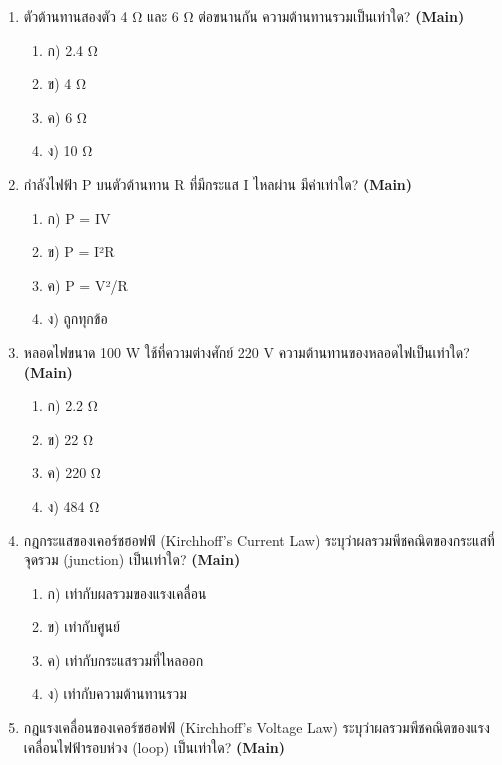 \documentclass[12pt]{article}
\begin{document}
\begin{enumerate}[label=\arabic*.]
\begin{enumerate}[label=)]
\item ก) 2.4 Ω
\item ข) 4 Ω
\item ค) 6 Ω
\item ง) 10 Ω
\end{enumerate}
\item ตัวต้านทานสองตัว 4 Ω และ 6 Ω ต่อขนานกัน ความต้านทานรวมเป็นเท่าใด? \hfill \textbf{\small (Main)}
\begin{enumerate}[label=)]
\item ก) 2.4 Ω
\item ข) 4 Ω
\item ค) 6 Ω
\item ง) 10 Ω
\end{enumerate}
\item กำลังไฟฟ้า P บนตัวต้านทาน R ที่มีกระแส I ไหลผ่าน มีค่าเท่าใด? \hfill \textbf{\small (Main)}
\begin{enumerate}[label=)]
\item ก) P = IV
\item ข) P = I²R
\item ค) P = V²/R
\item ง) ถูกทุกข้อ
\end{enumerate}
\item หลอดไฟขนาด 100 W ใช้ที่ความต่างศักย์ 220 V ความต้านทานของหลอดไฟเป็นเท่าใด? \hfill \textbf{\small (Main)}
\begin{enumerate}[label=)]
\item ก) 2.2 Ω
\item ข) 22 Ω
\item ค) 220 Ω
\item ง) 484 Ω
\end{enumerate}
\item กฎกระแสของเคอร์ชฮอฟฟ์ (Kirchhoff's Current Law) ระบุว่าผลรวมพีชคณิตของกระแสที่จุดรวม (junction) เป็นเท่าใด? \hfill \textbf{\small (Main)}
\begin{enumerate}[label=)]
\item ก) เท่ากับผลรวมของแรงเคลื่อน
\item ข) เท่ากับศูนย์
\item ค) เท่ากับกระแสรวมที่ไหลออก
\item ง) เท่ากับความต้านทานรวม
\end{enumerate}
\item กฎแรงเคลื่อนของเคอร์ชฮอฟฟ์ (Kirchhoff's Voltage Law) ระบุว่าผลรวมพีชคณิตของแรงเคลื่อนไฟฟ้ารอบห่วง (loop) เป็นเท่าใด? \hfill \textbf{\small (Main)}
\begin{enumerate}[label=)]

\end{enumerate}
\end{enumerate}
\end{document}
